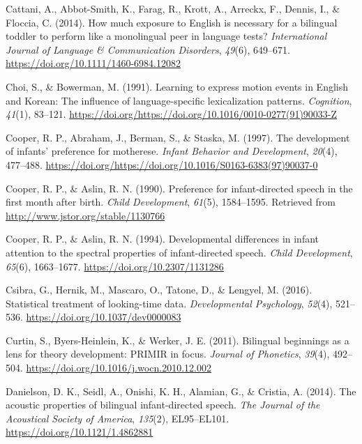 \documentclass[english,,man,floatsintext]{apa6}
\begin{document}
\leavevmode\hypertarget{ref-cattani_2014}{}%
Cattani, A., Abbot-Smith, K., Farag, R., Krott, A., Arreckx, F., Dennis, I., \& Floccia, C. (2014). How much exposure to English is necessary for a bilingual toddler to perform like a monolingual peer in language tests? \emph{International Journal of Language \& Communication Disorders}, \emph{49}(6), 649--671. \url{https://doi.org/10.1111/1460-6984.12082}

\leavevmode\hypertarget{ref-choi_1991}{}%
Choi, S., \& Bowerman, M. (1991). Learning to express motion events in English and Korean: The influence of language-specific lexicalization patterns. \emph{Cognition}, \emph{41}(1), 83--121. \url{https://doi.org/https://doi.org/10.1016/0010-0277(91)90033-Z}

\leavevmode\hypertarget{ref-cooper_1997}{}%
Cooper, R. P., Abraham, J., Berman, S., \& Staska, M. (1997). The development of infants' preference for motherese. \emph{Infant Behavior and Development}, \emph{20}(4), 477--488. \url{https://doi.org/https://doi.org/10.1016/S0163-6383(97)90037-0}

\leavevmode\hypertarget{ref-cooper_1990}{}%
Cooper, R. P., \& Aslin, R. N. (1990). Preference for infant-directed speech in the first month after birth. \emph{Child Development}, \emph{61}(5), 1584--1595. Retrieved from \url{http://www.jstor.org/stable/1130766}

\leavevmode\hypertarget{ref-cooper_1994}{}%
Cooper, R. P., \& Aslin, R. N. (1994). Developmental differences in infant attention to the spectral properties of infant-directed speech. \emph{Child Development}, \emph{65}(6), 1663--1677. \url{https://doi.org/10.2307/1131286}

\leavevmode\hypertarget{ref-csibra_2016}{}%
Csibra, G., Hernik, M., Mascaro, O., Tatone, D., \& Lengyel, M. (2016). Statistical treatment of looking-time data. \emph{Developmental Psychology}, \emph{52}(4), 521--536. \url{https://doi.org/10.1037/dev0000083}

\leavevmode\hypertarget{ref-curtin_2011}{}%
Curtin, S., Byers-Heinlein, K., \& Werker, J. E. (2011). Bilingual beginnings as a lens for theory development: PRIMIR in focus. \emph{Journal of Phonetics}, \emph{39}(4), 492--504. \url{https://doi.org/10.1016/j.wocn.2010.12.002}

\leavevmode\hypertarget{ref-danielson_2014}{}%
Danielson, D. K., Seidl, A., Onishi, K. H., Alamian, G., \& Cristia, A. (2014). The acoustic properties of bilingual infant-directed speech. \emph{The Journal of the Acoustical Society of America}, \emph{135}(2), EL95--EL101. \url{https://doi.org/10.1121/1.4862881}
\end{document}
